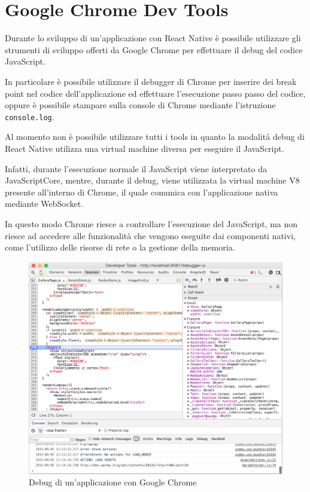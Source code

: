 \section{Google Chrome Dev Tools}\label{sec:chrome}

Durante lo sviluppo di un'applicazione con React Native è possibile utilizzare gli strumenti di sviluppo offerti da Google Chrome per effettuare il debug del codice JavaScript.

In particolare è possibile utilizzare il debugger di Chrome per inserire dei break point nel codice dell'applicazione ed effettuare l'esecuzione passo passo del codice, oppure è possibile stampare sulla console di Chrome mediante l'istruzione \texttt{console.log}.

Al momento non è possibile utilizzare tutti i tools in quanto la modalità debug di React Native utilizza una virtual machine diversa per eseguire il JavaScript.

Infatti, durante l'esecuzione normale il JavaScript viene interpretato da JavaScriptCore, mentre, durante il debug, viene utilizzata la virtual machine V8 presente all'interno di Chrome, il quale comunica con l'applicazione nativa mediante WebSocket.

In questo modo Chrome riesce a controllare l'esecuzione del JavaScript, ma non riesce ad accedere alle funzionalità che vengono eseguite dai componenti nativi, come l'utilizzo delle risorse di rete o la gestione della memoria.

\begin{figure}[htp]
\centering
\includegraphics[width=\textwidth]{../immagini/chrome-tools}
\caption{Debug di un'applicazione con Google Chrome}  
\end{figure}

